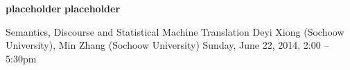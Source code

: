 \begin{bio}
\small
{\bfseries placeholder}
{\bfseries placeholder}
\end{bio}

\begin{tutorial}{Semantics, Discourse and Statistical Machine Translation}
  {Deyi Xiong (Sochoow University), Min Zhang (Sochoow University)}
  {Sunday, June 22, 2014, 2:00 -- 5:30pm}
  {\TutLocG}


\end{tutorial}
